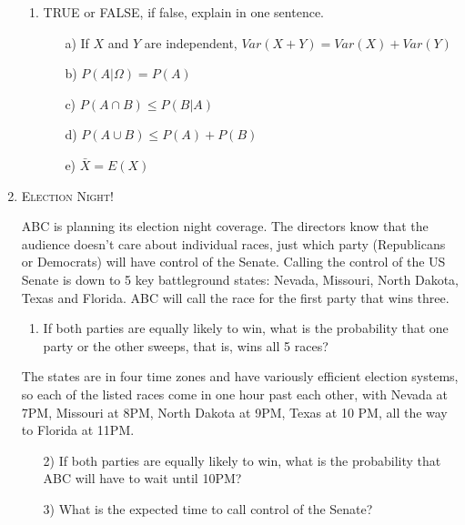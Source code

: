 \documentclass[11pt,letterpaper]{article}
\theoremstyle{definition}
\numberwithin{equation}{section}
\begin{document}
\begin{enumerate}[I]
\begin{enumerate}[1)]
\item TRUE or FALSE, if false, explain in one sentence.
\begin{enumerate}
\item[a)] If $X$ and $Y$ are independent, $Var(X+Y)=Var(X)+Var(Y)$
\item[b)] $P(A|\Omega)=P(A)$
\item[c)] $P(A\cap B) \leq P(B|A)$
\item[d)] $P(A\cup B)\leq P(A)+P(B)$
\item[e)] $\bar{X}=E(X)$
\end{enumerate}

\end{enumerate}
\pagebreak
\item \textsc{Election Night!} 

ABC is planning its election night coverage.  The directors know that the audience doesn't care about individual races, just which party (Republicans or Democrats) will have control of the Senate. Calling the control of the US Senate is down to 5 key battleground states:  Nevada, Missouri, North Dakota, Texas and Florida.  ABC will call the race for the first party that wins three.   
\begin{enumerate}[1)]
\item  If both parties are equally likely to win, what is the probability that one party or the other sweeps, that is, wins all 5 races?
\end{enumerate}

The states are in four time zones and have variously efficient election systems, so each of the listed races come in one hour past each other, with Nevada at 7PM, Missouri at 8PM, North Dakota at 9PM, Texas at 10 PM, all the way to Florida at 11PM.
\begin{enumerate}
\item[2)] If both parties are equally likely to win, what is the probability that ABC will have to wait until 10PM?
\item[3)] What is the expected time to call control of the Senate?
\end{enumerate}



\end{enumerate}
\end{document}
